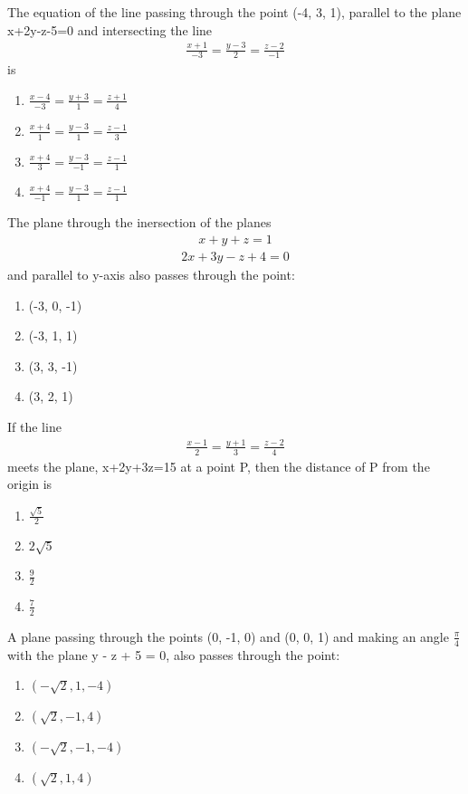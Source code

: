 \item The equation of the line passing through the point (-4, 3, 1), parallel to the plane x+2y-z-5=0 and intersecting the line 
\begin{align*}
\frac{x + 1}{-3} = \frac{y - 3}{2} = \frac{z - 2}{-1}
\end{align*}
is
\begin{enumerate}
\item $\frac{x-4}{-3} = \frac{y+3}{1} = \frac{z+1}{4}$
\item $\frac{x+4}{1} = \frac{y-3}{1} = \frac{z-1}{3}$
\item $\frac{x+4}{3} = \frac{y-3}{-1} = \frac{z-1}{1}$
\item $\frac{x+4}{-1} = \frac{y-3}{1} = \frac{z-1}{1}$
\end{enumerate}

\item The plane through the inersection of the planes 
\begin{align*}
x + y + z = 1 
\end{align*}
\begin{align*}
2x + 3y - z + 4 = 0
\end{align*}
and parallel to y-axis also passes through the point:
\begin{enumerate}
\item (-3, 0, -1)
\item (-3, 1, 1)
\item (3, 3, -1)
\item (3, 2, 1)
\end{enumerate}

\item If the line 
\begin{align*}
\frac{x-1}{2} = \frac{y+1}{3} = \frac{z-2}{4}
\end{align*}
meets the plane, x+2y+3z=15 at a point P, then the distance of P from the origin is
\begin{enumerate}
\item $\frac{\sqrt{5}}{2}$
\item $2\sqrt{5}$
\item $\frac{9}{2}$
\item $\frac{7}{2}$
\end{enumerate}

\item A plane passing through the points (0, -1, 0) and (0, 0, 1) and making an angle $\frac{\pi}{4}$ with the plane y - z + 5 = 0, also passes through the point:
\begin{enumerate}
\item $(-\sqrt{2}, 1, -4)$
\item $(\sqrt{2}, -1, 4)$
\item $(-\sqrt{2}, -1, -4)$
\item $(\sqrt{2}, 1, 4)$
\end{enumerate}

